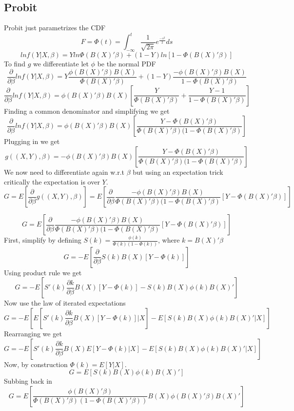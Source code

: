 \documentclass[11pt]{article}
\begin{document}
\subsection*{Probit}
Probit just parametrizes the CDF
\[F = \Phi(t) = \int_{-\infty}^t\frac{1}{\sqrt{2\pi}}e^{\frac{-s^2}{2}}ds\]
\[lnf(Y|X,\beta) = Yln\Phi(B(X)'\beta) + (1-Y)ln\left[1-\Phi(B(X)'\beta)\right]\]
To find $g$ we differentiate let $\phi$ be the normal PDF
\[\frac{\partial}{\partial \beta}lnf(Y|X,\beta) = Y \frac{\phi(B(X)'\beta)B(X)}{\Phi(B(X)'\beta)} + (1-Y)\frac{-\phi(B(X)'\beta)B(X)}{1-\Phi(B(X)'\beta)}\]
\[\frac{\partial}{\partial \beta}lnf(Y|X,\beta) = \phi(B(X)'\beta)B(X)\left[ \frac{Y}{\Phi(B(X)'\beta)} + \frac{Y-1}{1-\Phi(B(X)'\beta)}\right]\]
Finding a common denominator and simplifying we get 
\[\frac{\partial}{\partial \beta}lnf(Y|X,\beta) = \phi(B(X)'\beta)B(X)\left[ \frac{Y-\Phi(B(X)'\beta)}{\Phi(B(X)'\beta)(1-\Phi(B(X)'\beta)} \right]\]
Plugging in we get 
\[g((X,Y), \beta) = -\phi(B(X)'\beta)B(X)\left[ \frac{Y-\Phi(B(X)'\beta)}{\Phi(B(X)'\beta)(1-\Phi(B(X)'\beta)} \right]\]
We now need to differentiate again w.r.t $\beta$ but using an expectation trick critically the expectation is over $Y$.
\[G = E\left[\frac{\partial}{\partial \beta}g((X,Y),\beta) \right]= E\left[\frac{\partial}{\partial \beta}\frac{-\phi(B(X)'\beta)B(X)}{\Phi(B(X)'\beta)(1-\Phi(B(X)'\beta)}\left[Y-\Phi(B(X)'\beta) \right]\right]\]

\[G =E\left[\frac{\partial}{\partial \beta}\frac{-\phi(B(X)'\beta)B(X)}{\Phi(B(X)'\beta)(1-\Phi(B(X)'\beta)}\left[Y-\Phi(B(X)'\beta) \right]\right]\]
First, simplify by defining $S(k) = \frac{\phi(k)}{\Phi(k)(1-\Phi(k))}$, where $k = B(X)'\beta$
\[G =-E\left[\frac{\partial}{\partial \beta}  S(k)B(X)\left[Y-\Phi(k) \right]\right]\]
Using product rule we get
\[G =-E\left[  S'(k)\frac{\partial k}{\partial \beta}B(X)\left[Y-\Phi(k) \right] - S(k)B(X)\phi(k)B(X)'\right]\]
Now use the law of iterated expectations 
\[G =-E\left[E\left[  S'(k)\frac{\partial k}{\partial \beta}B(X)[Y-\Phi(k) ]|X\right] - E\left[S(k)B(X)\phi(k)B(X)'|X\right]\right]\]
Rearranging we get
\[G =-E\left[S'(k)\frac{\partial k}{\partial \beta}B(X)E\left[Y-\Phi(k) |X\right] - E\left[S(k)B(X)\phi(k)B(X)'|X\right]\right]\]
Now, by construction $\Phi(k) = E[Y|X]$.
\[G =E\left[S(k)B(X)\phi(k)B(X)'\right]\]
Subbing back in 
\[G =E\left[\frac{\phi(B(X)'\beta)}{\Phi(B(X)'\beta)(1-\Phi(B(X)'\beta))}B(X)\phi(B(X)'\beta)B(X)'\right]\]
\end{document}
